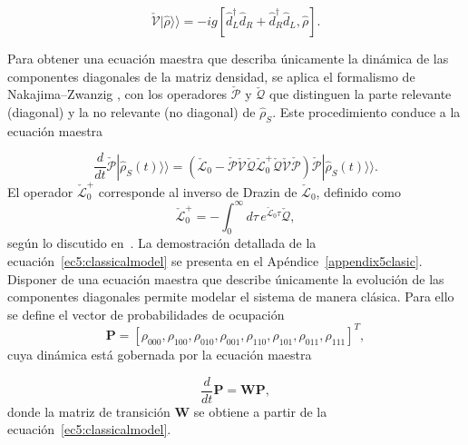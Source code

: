 \begin{equation*}
\check{\mathcal{V}}|\hat{\rho}\rangle\rangle = -ig[\hat{d}_{L}^{\dagger} \hat{d}_{R} + \hat{d}_{R}^{\dagger} \hat{d}_{L}, \hat{\rho}].
\end{equation*}

Para obtener una ecuación maestra que describa únicamente la dinámica de las componentes diagonales de la matriz densidad, se aplica el formalismo de Nakajima–Zwanzig \cite{zwanzig1966statistical}, con los operadores $\check{\mathcal{P}}$ y $\check{\mathcal{Q}}$ que distinguen la parte relevante (diagonal) y la no relevante (no diagonal) de $\hat{\rho}_{S}$. Este procedimiento conduce a la ecuación maestra

\begin{equation}
    \frac{d}{dt}\check{\mathcal{P}}|\hat{\rho}_{S}(t)\rangle \rangle = \left(\check{\mathcal{L}}_{0} - \check{\mathcal{P}}\check{\mathcal{V}}\check{\mathcal{Q}}\check{\mathcal{L}}^{+}_{0}\check{\mathcal{Q}}\check{\mathcal{V}}\check{\mathcal{P}}\right)\check{\mathcal{P}}|\hat{\rho}_{S}(t)\rangle \rangle. 
\label{ec5:classicalmodel}
\end{equation}
El operador $\check{\mathcal{L}}_{0}^{+}$ corresponde al inverso de Drazin de $\check{\mathcal{L}}_{0}$, definido como
\begin{equation*}
\check{\mathcal{L}}_{0}^{+} = -\int_{0}^{\infty} d\tau\, e^{\check{\mathcal{L}}_{0} \tau} \check{\mathcal{Q}},
\end{equation*}
según lo discutido en~\cite{landi2024current}. La demostración detallada de la ecuación~\eqref{ec5:classicalmodel} se presenta en el Apéndice~\ref{appendix5clasic}.
\\

Disponer de una ecuación maestra que describe únicamente la evolución de las componentes diagonales permite modelar el sistema de manera clásica. Para ello se define el vector de probabilidades de ocupación
\begin{equation*}
\mathbf{P} = [\rho_{000}, \rho_{100}, \rho_{010}, \rho_{001}, \rho_{110}, \rho_{101}, \rho_{011}, \rho_{111}]^{T},
\end{equation*}
cuya dinámica está gobernada por la ecuación maestra

\begin{equation}
    \frac{d}{dt}\textbf{P} = \textbf{W}\textbf{P},
    \label{sec5:classicsemi}
\end{equation}
donde la matriz de transición $\mathbf{W}$ se obtiene a partir de la ecuación~\eqref{ec5:classicalmodel}.
\\


